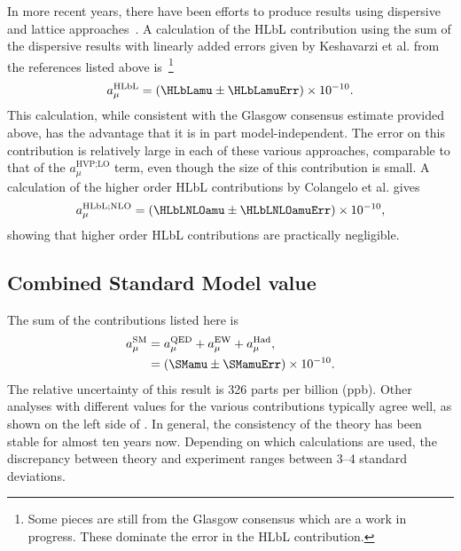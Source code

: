 In more recent years, there have been efforts to produce results using dispersive~\cite{PhysRevLett.121.112002,PhysRevD.95.054026,Hoferichter:2018kwz,Colangelo:2015ama,Colangelo:2017fiz,Colangelo:2017another,Colangelo:2019uex,Colangelo:2019lpu} and lattice approaches~\cite{Blum:2019ugy,Asmussen:2019act}. A calculation of the HLbL contribution using the sum of the dispersive results with linearly added errors given by Keshavarzi et al. from the references listed above is~\cite{Keshavarzi:2019abf}\footnote{Some pieces are still from the Glasgow consensus which are a work in progress. These dominate the error in the HLbL contribution.}
		\begin{align}
            a_{\mu}^{\text{HLbL}} = (\HLbLamu \pm \HLbLamuErr) \times 10^{-10}.
		\end{align}
This calculation, while consistent with the Glasgow consensus estimate provided above, has the advantage that it is in part model-independent. The error on this contribution is relatively large in each of these various approaches, comparable to that of the $a_{\mu}^{\text{HVP;LO}}$ term, even though the size of this contribution is small. A calculation of the higher order HLbL contributions by Colangelo et al. gives~\cite{Colangelo:2014qya}
		\begin{align}
            a_{\mu}^{\text{HLbL;NLO}} = (\HLbLNLOamu \pm \HLbLNLOamuErr) \times 10^{-10},
		\end{align}
showing that higher order HLbL contributions are practically negligible.





\subsection{Combined Standard Model value}

The sum of the \amu contributions listed here is~\cite{Kinoshita1,Kinoshita2,Ishikawa:2018rlv,Keshavarzi:2019abf,Kurz:2014wya,Prades:2009tw,Colangelo:2014qya}
		\begin{equation}
		\begin{aligned}
            a_{\mu}^{\text{SM}} &= a_{\mu}^{\text{QED}} + a_{\mu}^{\text{EW}} + a_{\mu}^{\text{Had}}, \\
			&= (\SMamu \pm \SMamuErr) \times 10^{-10}.
		\end{aligned}
		\end{equation}
The relative uncertainty of this result is 326 parts per billion (ppb). Other analyses with different values for the various contributions typically agree well, as shown on the left side of . In general, the consistency of the theory has been stable for almost ten years now. Depending on which calculations are used, the discrepancy between theory and experiment ranges between \SIrange{3}{4}{} standard deviations. 



